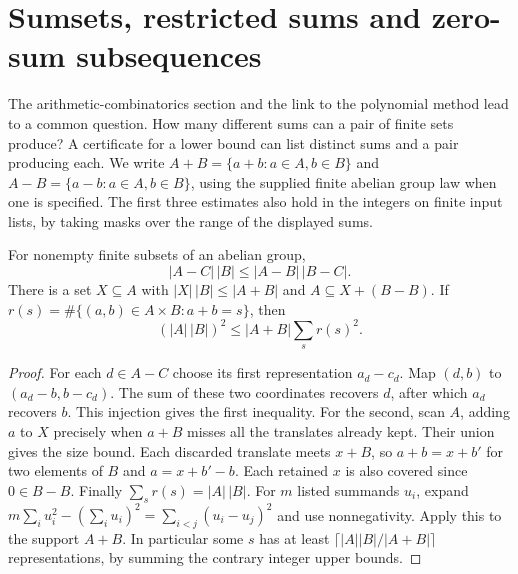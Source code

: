 \section{Sumsets, restricted sums and zero-sum subsequences}
\label{sec:additive}
The arithmetic-combinatorics section and the link to the polynomial method lead to a common question. How many different sums can a pair of finite sets produce? A certificate for a lower bound can list distinct sums and a pair producing each. We write $A+B=\{a+b:a\in A,b\in B\}$ and $A-B=\{a-b:a\in A,b\in B\}$, using the supplied finite abelian group law when one is specified. The first three estimates also hold in the integers on finite input lists, by taking masks over the range of the displayed sums.

\begin{theorem}\label{result59}
For nonempty finite subsets of an abelian group,
\[
 |A-C|\,|B|\le |A-B|\,|B-C|.
\]
There is a set $X\subseteq A$ with $|X|\,|B|\le |A+B|$ and $A\subseteq X+(B-B)$. If $r(s)=\#\{(a,b)\in A\times B:a+b=s\}$, then
\[
 (|A|\,|B|)^2\le |A+B|\sum_s r(s)^2.
\]
\end{theorem}
\begin{proof}
For each $d\in A-C$ choose its first representation $a_d-c_d$. Map $(d,b)$ to $(a_d-b,b-c_d)$. The sum of these two coordinates recovers $d$, after which $a_d$ recovers $b$. This injection gives the first inequality. For the second, scan $A$, adding $a$ to $X$ precisely when $a+B$ misses all the translates already kept. Their union gives the size bound. Each discarded translate meets $x+B$, so $a+b=x+b'$ for two elements of $B$ and $a=x+b'-b$. Each retained $x$ is also covered since $0\in B-B$. Finally $\sum_s r(s)=|A|\,|B|$. For $m$ listed summands $u_i$, expand $m\sum_i u_i^2-(\sum_i u_i)^2=\sum_{i<j}(u_i-u_j)^2$ and use nonnegativity. Apply this to the support $A+B$. In particular some $s$ has at least $\lceil |A||B|/|A+B|\rceil$ representations, by summing the contrary integer upper bounds.
\end{proof}

